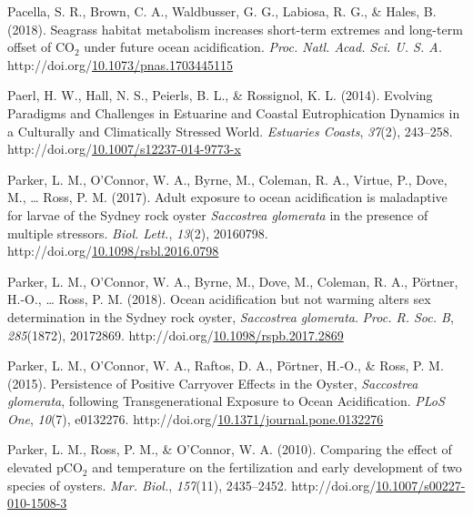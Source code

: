 \documentclass [11pt, proquest] {uwthesis}[2015/03/03]
\newlength{\cslhangindent}
\newenvironment{CSLReferences}%
{\setlength{\parindent}{0pt}%
\everypar{\setlength{\hangindent}{\cslhangindent}}\ignorespaces}%
{\par}
\begin{document}
\begin{CSLReferences}{1}{0}
\leavevmode\hypertarget{ref-Pacella2018}{}%
Pacella, S. R., Brown, C. A., Waldbusser, G. G., Labiosa, R. G., \& Hales, B. (2018). {Seagrass habitat metabolism increases short-term extremes and long-term offset of {CO\(_2\)} under future ocean acidification}. \emph{Proc. Natl. Acad. Sci. U. S. A.} http://doi.org/\href{https://doi.org/10.1073/pnas.1703445115}{10.1073/pnas.1703445115}

\leavevmode\hypertarget{ref-Paerl2014}{}%
Paerl, H. W., Hall, N. S., Peierls, B. L., \& Rossignol, K. L. (2014). {Evolving Paradigms and Challenges in Estuarine and Coastal Eutrophication Dynamics in a Culturally and Climatically Stressed World}. \emph{Estuaries Coasts}, \emph{37}(2), 243--258. http://doi.org/\href{https://doi.org/10.1007/s12237-014-9773-x}{10.1007/s12237-014-9773-x}

\leavevmode\hypertarget{ref-Parker2017}{}%
Parker, L. M., O'Connor, W. A., Byrne, M., Coleman, R. A., Virtue, P., Dove, M., \ldots{} Ross, P. M. (2017). {Adult exposure to ocean acidification is maladaptive for larvae of the Sydney rock oyster \emph{Saccostrea glomerata} in the presence of multiple stressors}. \emph{Biol. Lett.}, \emph{13}(2), 20160798. http://doi.org/\href{https://doi.org/10.1098/rsbl.2016.0798}{10.1098/rsbl.2016.0798}

\leavevmode\hypertarget{ref-Parker2018}{}%
Parker, L. M., O'Connor, W. A., Byrne, M., Dove, M., Coleman, R. A., Pörtner, H.-O., \ldots{} Ross, P. M. (2018). {Ocean acidification but not warming alters sex determination in the Sydney rock oyster, \emph{Saccostrea glomerata}}. \emph{Proc. R. Soc. B}, \emph{285}(1872), 20172869. http://doi.org/\href{https://doi.org/10.1098/rspb.2017.2869}{10.1098/rspb.2017.2869}

\leavevmode\hypertarget{ref-Parker2015}{}%
Parker, L. M., O'Connor, W. A., Raftos, D. A., Pörtner, H.-O., \& Ross, P. M. (2015). {Persistence of Positive Carryover Effects in the Oyster, \emph{Saccostrea glomerata}, following Transgenerational Exposure to Ocean Acidification}. \emph{PLoS One}, \emph{10}(7), e0132276. http://doi.org/\href{https://doi.org/10.1371/journal.pone.0132276}{10.1371/journal.pone.0132276}

\leavevmode\hypertarget{ref-Parker2010}{}%
Parker, L. M., Ross, P. M., \& O'Connor, W. A. (2010). {Comparing the effect of elevated {pCO\(_2\)} and temperature on the fertilization and early development of two species of oysters}. \emph{Mar. Biol.}, \emph{157}(11), 2435--2452. http://doi.org/\href{https://doi.org/10.1007/s00227-010-1508-3}{10.1007/s00227-010-1508-3}


\end{CSLReferences}
\end{document}
